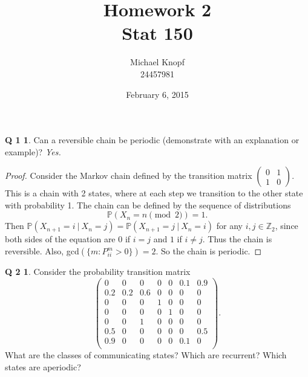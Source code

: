 \documentclass[12pt]{article}
\newcommand{\p}{\mathbb{P}}
\theoremstyle{definition}
\newtheorem*{prob1}{Q 1}
\newtheorem*{prob2}{Q 2}
\begin{document}
\title{Homework 2 \\ Stat 150}
\author{Michael Knopf \\ 24457981}
\date{February 6, 2015}
\maketitle


\begin{prob1}
Can a reversible chain be periodic (demonstrate with an explanation or example)? \emph{Yes.}
\end{prob1}

\begin{proof}

Consider the Markov chain defined by the transition matrix $\left(
\begin{matrix}
0 & 1 \\
1 & 0
\end{matrix}
\right)$.  This is a chain with 2 states, where at each step we transition to the other state with probability 1.  The chain can be defined by the sequence of distributions $$\p(X_n = n \pmod{2}) = 1.$$  Then $\p(X_{n+1} = i \ | \ X_n = j) = \p(X_{n+1} = j \ | \ X_n = i)$ for any $i,j \in \mathbb{Z}_2$, since both sides of the equation are $0$ if $i=j$ and $1$ if $i \neq j$.  Thus the chain is reversible.  Also, gcd$(\{m : P_{ii}^m > 0\}) = 2$.  So the chain is periodic.

\end{proof}

\begin{prob2}
Consider the probability transition matrix
$$ \left(
\begin{matrix}
0 & 0 & 0 & 0 & 0 & 0.1 & 0.9 \\
0.2 & 0.2 & 0.6 & 0 & 0 & 0 & 0 \\
0 & 0 & 0 & 1 & 0 & 0 & 0 \\
0 & 0 & 0 & 0 & 1 & 0 & 0 \\
0 & 0 & 1 & 0 & 0 & 0 & 0 \\
0.5 & 0 & 0 & 0 & 0 & 0 & 0.5 \\
0.9 & 0 & 0 & 0 & 0 & 0.1 & 0 \\
\end{matrix}
\right).$$
What are the classes of communicating states?  Which are recurrent?  Which states are aperiodic?
\end{prob2}
\end{document}
